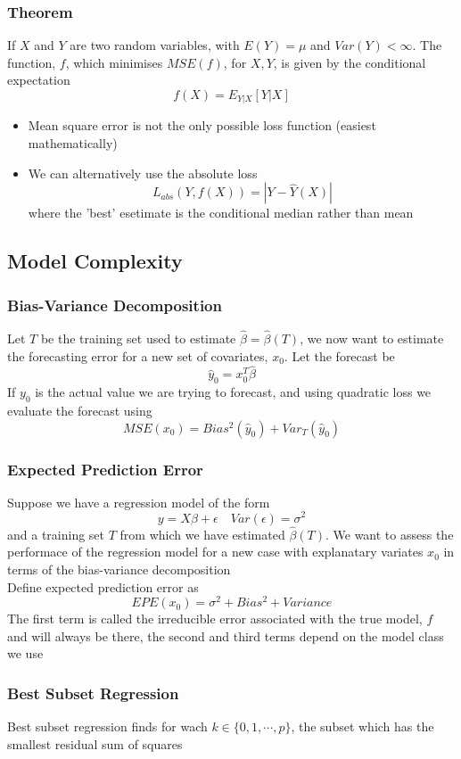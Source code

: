 \documentclass[11pt]{article}
\begin{document}
\subsubsection*{Theorem}
If $X$ and $Y$ are two random variables, with $E(Y)=\mu$ and $Var(Y)<\infty$. The function, $f$, which minimises $MSE(f)$, for $X,Y$, is given by the conditional expectation 
\[f(X)=E_{Y|X}[Y|X]\]
\begin{itemize}
    \item Mean square error is not the only possible loss function (easiest mathematically)
    \item We can alternatively use the absolute loss \[L_{abs}(Y,f(X))=|Y-\hat{Y}(X)|\] where the 'best' esetimate is the conditional median rather than mean 
\end{itemize}
\subsection{Model Complexity}
\subsubsection{Bias-Variance Decomposition}
Let $T$ be the training set used to estimate $\hat{\beta}=\hat{\beta}(T)$, we now want to estimate the forecasting error for 
a new set of covariates, $x_0$. Let the forecast be 
\[\hat{y}_0=x_0^T\hat{\beta}\]    
If $y_0$ is the actual value we are trying to forecast, and using quadratic loss we evaluate the forecast using 
\[MSE(x_0)=Bias^2(\hat{y}_0)+Var_T(\hat{y}_0)\]   
\subsubsection{Expected Prediction Error}
Suppose we have a regression model of the form 
\[y=X\beta+\epsilon\quad Var(\epsilon)=\sigma^2\]
and a training set $T$ from which we have estimated $\hat{\beta}(T)$. We want to assess the performace of the 
regression model for a new case with explanatary variates $x_0$ in terms of the bias-variance decomposition \\
Define expected prediction error as 
\[EPE(x_0)=\sigma^2+Bias^2+Variance\]    
The first term is called the irreducible error associated with the true model, $f$ and will always be there, the 
second and third terms depend on the model class we use 
\subsubsection{Best Subset Regression}
Best subset regression finds for wach $k\in\{0,1,\cdots,p\}$, the subset which has the smallest residual sum of squares 
\end{document}
